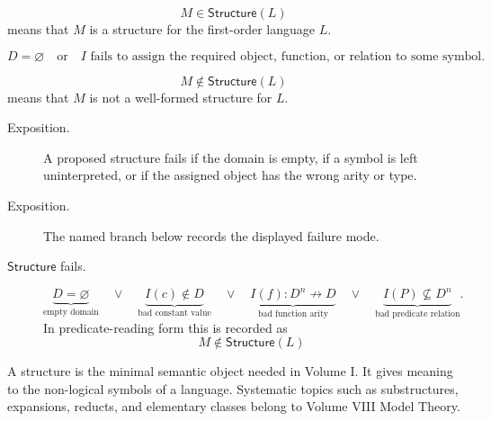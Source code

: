 \begin{remark*}
\[
  M\in\mathsf{Structure}(L)
\] means that \(M\) is a structure for the
first-order language \(L\).
\end{remark*}

\begin{remark*}
\[
D=\varnothing
\quad\text{or}\quad
I \text{ fails to assign the required object, function, or relation to some symbol.}
\]
\end{remark*}

\begin{remark*}
\[
  M\notin\mathsf{Structure}(L)
\] means that \(M\) is not a well-formed
structure for \(L\).
\end{remark*}

\begin{remark*}
\begin{description}
  \item[Exposition.] A proposed structure fails if the domain is empty, if a symbol is left
uninterpreted, or if the assigned object has the wrong arity or type.
\end{description}
\end{remark*}

\begin{remark*}
\begin{description}
  \item[Exposition.] The named branch below records the displayed failure mode.
\item[\(\mathsf{Structure}\) fails.] \[
\underbrace{D=\varnothing}_{\text{empty domain}}
\quad\lor\quad
\underbrace{I(c)\notin D}_{\text{bad constant value}}
\quad\lor\quad
\underbrace{I(f):D^n\not\to D}_{\text{bad function arity}}
\quad\lor\quad
\underbrace{I(P)\not\subseteq D^n}_{\text{bad predicate relation}}.
\]
  In predicate-reading form this is recorded as
  \[
    M\notin\mathsf{Structure}(L)
  \]
\end{description}
\end{remark*}

\begin{remark*}[Interpretation]
A structure is the minimal semantic object needed in Volume I. It gives
meaning to the non-logical symbols of a language. Systematic topics such as
substructures, expansions, reducts, and elementary classes belong to Volume
VIII Model Theory.
\end{remark*}

